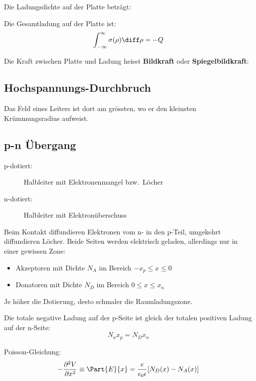 		Die Ladungsdichte auf der Platte beträgt:
		
		Die Gesamtladung auf der Platte ist:
		\begin{equation*}
			\int_{-\infty}^{\infty} \sigma(\rho) \diff \rho = -Q
		\end{equation*}
		
		Die Kraft zwischen Platte und Ladung heisst \textbf{Bildkraft} oder \textbf{Spiegelbildkraft}:
	\subsection{Hochspannungs-Durchbruch} %
		Das Feld eines Leiters ist dort am grössten, wo er den kleinsten Krümmungsradius aufweist.
	\subsection{p-n Übergang} %
		\begin{description}
			\item[p-dotiert:] Halbleiter mit Elektronenmangel bzw.~Löcher
			\item[n-dotiert:] Halbleiter mit Elektronüberschuss
		\end{description}
		
		Beim Kontakt diffundieren Elektronen vom n- in den p-Teil, umgekehrt diffundieren Löcher.
		Beide Seiten werden elektrisch geladen, allerdings nur in einer gewissen Zone:
		\begin{itemize}
			\item Akzeptoren mit Dichte $N_A$ im Bereich $-x_p \leq x \leq 0$
			\item Donatoren mit Dichte $N_D$ im Bereich $0 \leq x \leq x_n$
		\end{itemize}
		Je höher die Dotierung, desto schmaler die Raumladungszone.
		
		Die totale negative Ladung auf der p-Seite ist gleich der totalen positiven Ladung auf der n-Seite:
		\begin{equation*}
			N_a x_p = N_D x_n
		\end{equation*}
		
		Poisson-Gleichung:
		\begin{equation*}
			-\frac{\partial^2 V}{\partial x^2} \equiv \Part{E}{x} = \frac{e}{\epsilon_0 \epsilon} [N_D(x) - N_A(x)]
		\end{equation*}
		
